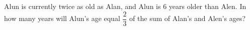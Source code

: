 Alun is currently twice as old as Alan, and Alun is $6$ years older than Alen. In how many years will Alun's age equal $\dfrac23$ of the sum of Alan's and Alen's ages?
